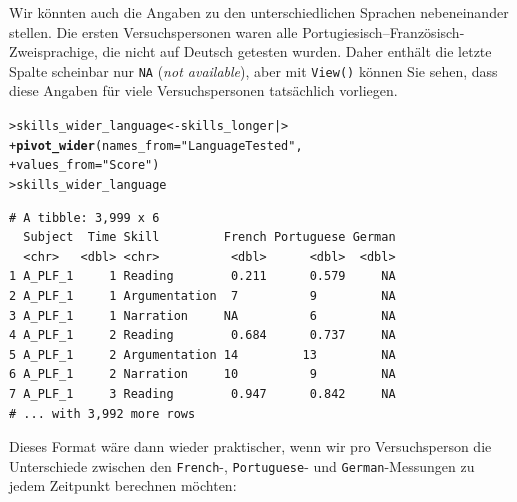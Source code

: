 \documentclass[oneside, 10pt]{book}\usepackage[]{graphicx}\usepackage[]{xcolor}
\makeatletter
\newcommand{\hlstr}[1]{\textcolor[rgb]{0.192,0.494,0.8}{#1}}%
\newcommand{\hlstd}[1]{\textcolor[rgb]{0.345,0.345,0.345}{#1}}%
\newcommand{\hlkwb}[1]{\textcolor[rgb]{0.69,0.353,0.396}{#1}}%
\newcommand{\hlkwc}[1]{\textcolor[rgb]{0.333,0.667,0.333}{#1}}%
\newcommand{\hlkwd}[1]{\textcolor[rgb]{0.737,0.353,0.396}{\textbf{#1}}}%
\newenvironment{kframe}{%
 \def\at@end@of@kframe{}%
 \ifinner\ifhmode%
  \def\at@end@of@kframe{\end{minipage}}%
  \begin{minipage}{\columnwidth}%
 \fi\fi%
 \def\FrameCommand##1{\hskip\@totalleftmargin \hskip-\fboxsep
 \colorbox{shadecolor}{##1}\hskip-\fboxsep
     \hskip-\linewidth \hskip-\@totalleftmargin \hskip\columnwidth}%
 \MakeFramed {\advance\hsize-\width
   \@totalleftmargin\z@ \linewidth\hsize
   \@setminipage}}%
 {\par\unskip\endMakeFramed%
 \at@end@of@kframe}
\newenvironment{knitrout}{}{} %
\makeatother
\begin{document}
Wir könnten auch die Angaben zu den unterschiedlichen Sprachen nebeneinander stellen.
Die ersten Versuchspersonen waren alle Portugiesisch--Französisch-Zwei\-sprachige,
die nicht auf Deutsch getesten wurden. Daher enthält die letzte Spalte scheinbar
nur \texttt{NA} (\textit{not available}), aber mit \texttt{View()} können Sie
sehen, dass diese Angaben für viele Versuchspersonen tatsächlich vorliegen.
\begin{knitrout}
\color{fgcolor}\begin{kframe}
\begin{alltt}
\hlstd{> }\hlstd{skills_wider_language} \hlkwb{<-} \hlstd{skills_longer |>}
\hlstd{+ }  \hlkwd{pivot_wider}\hlstd{(}\hlkwc{names_from} \hlstd{=} \hlstr{"LanguageTested"}\hlstd{,}
\hlstd{+ }              \hlkwc{values_from} \hlstd{=} \hlstr{"Score"}\hlstd{)}
\hlstd{> }\hlstd{skills_wider_language}
\end{alltt}
\begin{verbatim}
# A tibble: 3,999 x 6
  Subject  Time Skill         French Portuguese German
  <chr>   <dbl> <chr>          <dbl>      <dbl>  <dbl>
1 A_PLF_1     1 Reading        0.211      0.579     NA
2 A_PLF_1     1 Argumentation  7          9         NA
3 A_PLF_1     1 Narration     NA          6         NA
4 A_PLF_1     2 Reading        0.684      0.737     NA
5 A_PLF_1     2 Argumentation 14         13         NA
6 A_PLF_1     2 Narration     10          9         NA
7 A_PLF_1     3 Reading        0.947      0.842     NA
# ... with 3,992 more rows
\end{verbatim}
\end{kframe}
\end{knitrout}
Dieses Format wäre dann wieder praktischer, wenn wir
pro Versuchsperson die Unterschiede zwischen den
\texttt{French}-, \texttt{Portuguese}- und \texttt{German}-Messungen
zu jedem Zeitpunkt berechnen möchten:
\end{document}
